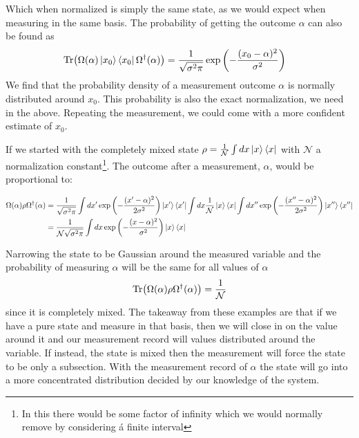 Which when normalized is simply the same state, as we would expect when measuring in the same basis. The probability of getting the outcome $\alpha$ can also be found as
\begin{align}
    \Tr(\Omega(\alpha) \ket{x_0}\bra{x_0} \Omega^\dagger(\alpha)) &= \frac{1}{\sqrt{\sigma^2\pi}} \exp\left(-\frac{(x_0 - \alpha)^2}{\sigma^2}\right)
\end{align}
We find that the probability density of a measurement outcome $\alpha$ is normally distributed around $x_0$. This probability is also the exact normalization, we need in the above. Repeating the measurement, we could come with a more confident estimate of $x_0$.

If we started with the completely mixed state $\rho = \frac{1}{\mathcal{N}}\int dx \ket{x}\bra{x}$ with $\mathcal{N}$ a normalization constant\footnote{In this there would be some factor of infinity which we would normally remove by considering á finite interval}. The outcome after a measurement, $\alpha$, would be proportional to:
\begin{fullwidth}
\begin{align}
        \Omega(\alpha) \rho  \Omega^\dagger(\alpha) &= \frac{1}{\sqrt{\sigma^2\pi}}\int dx' \exp\left(-\frac{(x'- \alpha)^2}{2\sigma^2}\right)\ket{x'}\bra{x'}\int dx \frac{1}{\mathcal{N}}\ket{x}\bra{x}\int dx'' \exp\left(-\frac{(x''- \alpha)^2}{2\sigma^2}\right)\ket{x''}\bra{x''} \nonumber \\
        &= \frac{1}{\mathcal{N}\sqrt{\sigma^2\pi}}\int dx\exp\left(-\frac{(x- \alpha)^2}{\sigma^2}\right)\ket{x}\bra{x}
\end{align}
\end{fullwidth}
Narrowing the state to be Gaussian around the measured variable and the probability of measuring $\alpha$ will be the same for all values of $\alpha$
\begin{equation}
     \Tr(\Omega(\alpha) \rho \Omega^\dagger(\alpha)) = \frac{1}{\mathcal{N}}
\end{equation}
since it is completely mixed. The takeaway from these examples are that if we have a pure state and measure in that basis, then we will close in on the value around it and our measurement record will values distributed around the variable. If instead, the state is mixed then the measurement will force the state to be only a subsection. With the measurement record of $\alpha$ the state will go into a more concentrated distribution decided by our knowledge of the system.


